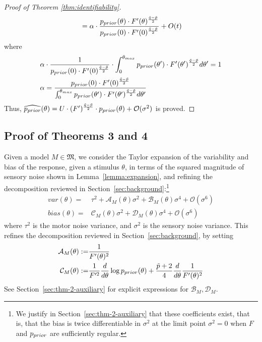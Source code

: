 \begin{proof}[Proof of Theorem \ref{thm:identifiability}]
\begin{align*}
    &= \alpha \cdot \frac{p_{prior}(\theta) \cdot F'(\theta)^{\frac{\tilde{q}-\tilde{p}}{2}}}{p_{prior}(0) \cdot F'(0)^{\frac{\tilde{q}-\tilde{p}}{2}}} + O(t)\\
\end{align*}
where
\begin{align*}
    \alpha &\cdot \frac{1}{p_{prior}(0) \cdot F'(0)^{\frac{\tilde{q}-\tilde{p}}{2}}} \cdot \int_0^{\theta_{max}} p_{prior}(\theta') \cdot F'(\theta')^{\frac{\tilde{q}-\tilde{p}}{2}} d\theta' = 1\\
    \alpha &= \frac{p_{prior}(0) \cdot F'(0)^{\frac{\tilde{q}-\tilde{p}}{2}}}{\int_0^{\theta_{max}} p_{prior}(\theta') \cdot F'(\theta')^{\frac{\tilde{q}-\tilde{p}}{2}} d\theta'}\\  
\end{align*}
Thus, $\widehat{p_{prior}}(\theta) = U \cdot (F')^{\frac{\tilde{q}-\tilde{p}}{2}} \cdot p_{prior}(\theta) + \mathcal{O}(\sigma^2)$ is proved.

\end{proof}


\subsection{Proof of Theorems 3 and 4}\label{sec:theorems-two-levels}


Given a model $M \in \mathfrak{M}$, we consider the Taylor expansion of the variability and bias of the response, given a stimulus $\theta$, in terms of the squared magnitude of sensory noise shown in Lemma~\ref{lemma:expansion}, and refining the decomposition reviewed in Section~\ref{sec:background}:\footnote{We justify in Section~\ref{sec:thm-2-auxiliary} that these coefficients exist, that is, that the bias is twice differentiable in $\sigma^2$ at the limit point $\sigma^2=0$ when $F$ and $p_{prior}$ are sufficiently regular.}
\begin{align*}
var(\theta) =& 
\tau^2 + \mathcal{A}_M(\theta) \sigma^2 + \mathcal{B}_M(\theta) \sigma^4 + \mathcal{O}(\sigma^6) \\
    bias(\theta) =& 
    \mathcal{C}_M(\theta) \sigma^2 + \mathcal{D}_M(\theta) \sigma^4 + \mathcal{O}(\sigma^6)
\end{align*}
where $\tau^2$ is the motor noise variance, and $\sigma^2$ is the sensory noise variance. This refines the decomposition reviewed in Section~\ref{sec:background}, by setting
\begin{align*}
    \mathcal{A}_M(\theta) :=& \frac{1}{F'(\theta)^2} \\
    \mathcal{C}_M(\theta) :=& \frac{1}{F'^2} \frac{d}{d\theta} \log p_{prior}(\theta) + \frac{\tilde{p}+2}{4} \frac{d}{d\theta} \frac{1}{F'(\theta)^2}
\end{align*}
See Section~\ref{sec:thm-2-auxiliary} for explicit expressions for $\mathcal{B}_M, \mathcal{D}_M$.

